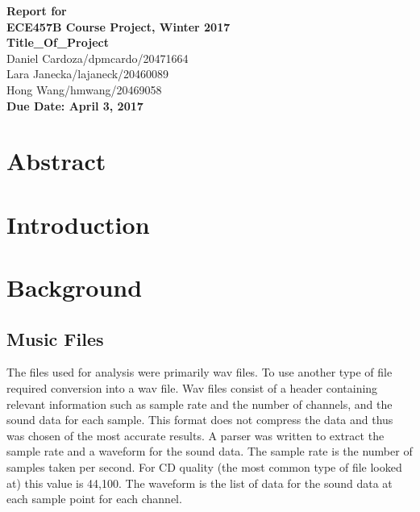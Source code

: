 \documentclass[12pt]{article}
\begin{document}
\begin{center}
{\Large\bf Report for}\\
\vspace{1mm}
{\Large\bf ECE457B Course Project, Winter 2017}\\
\vspace{2mm}
{\Large\bf Title\_Of\_Project}\\
\vspace{4mm}
{Daniel Cardoza/dpmcardo/20471664}\\
{Lara Janecka/lajaneck/20460089}\\
{Hong Wang/hmwang/20469058}\\
\vspace{2mm}
\textbf{Due Date: April 3, 2017}
\end{center}

\def\question#1{\item[\bf #1.]}
\def\part#1{\item[\bf #1)]}
\newcommand{\pc}[1]{\mbox{\textbf{#1}}} %

\section{Abstract}

\section{Introduction}

\section{Background}
\subsection{Music Files}
The files used for analysis were primarily wav files. To use another type of file required conversion into a wav file. Wav files consist of a header containing relevant information such as sample rate and the number of channels, and the sound data for each sample. This format does not compress the data and thus was chosen of the most accurate results. A parser was written to extract the sample rate and a waveform for the sound data. The sample rate is the number of samples taken per second. For CD quality (the most common type of file looked at) this value is 44,100. The waveform is the list of data for the sound data at each sample point for each channel.
\end{document}
